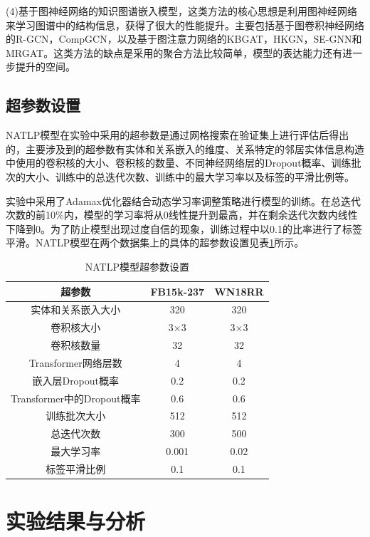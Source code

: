 (4)基于图神经网络的知识图谱嵌入模型，这类方法的核心思想是利用图神经网络来学习图谱中的结构信息，获得了很大的性能提升。主要包括基于图卷积神经网络的R-GCN，CompGCN，以及基于图注意力网络的KBGAT，HKGN，SE-GNN和MRGAT。这类方法的缺点是采用的聚合方法比较简单，模型的表达能力还有进一步提升的空间。

\subsection{超参数设置}

NATLP模型在实验中采用的超参数是通过网格搜索在验证集上进行评估后得出的，主要涉及到的超参数有实体和关系嵌入的维度、关系特定的邻居实体信息构造中使用的卷积核的大小、卷积核的数量、不同神经网络层的Dropout概率、训练批次的大小、训练中的总迭代次数、训练中的最大学习率以及标签的平滑比例等。

实验中采用了Adamax优化器结合动态学习率调整策略进行模型的训练。在总迭代次数的前10\%内，模型的学习率将从0线性提升到最高，并在剩余迭代次数内线性下降到0。为了防止模型出现过度自信的现象，训练过程中以0.1的比率进行了标签平滑。NATLP模型在两个数据集上的具体的超参数设置见表\ref{NALTP_hyperparameter}所示。

\begin{table}[htbp]
  \renewcommand\arraystretch{1.5}
  \caption{NATLP模型超参数设置}
  \centering
  \begin{tabular}{*{3}{c}}
    \toprule
    超参数 & FB15k-237 & WN18RR\\
    \midrule
    实体和关系嵌入大小  & 320 & 320 \\
    卷积核大小 & 3$\times$3 & 3$\times$3\\
    卷积核数量 & 32 & 32\\
    Transformer网络层数& 4 & 4\\
    嵌入层Dropout概率 & 0.2 & 0.2\\
    Transformer中的Dropout概率 & 0.6 & 0.6\\
    训练批次大小 & 512 & 512\\
    总迭代次数& 300 & 500 \\
    最大学习率 & 0.001 & 0.02\\
    标签平滑比例 & 0.1 & 0.1\\
    \bottomrule
  \end{tabular}
  \label{NALTP_hyperparameter}
\end{table}

\section{实验结果与分析}


